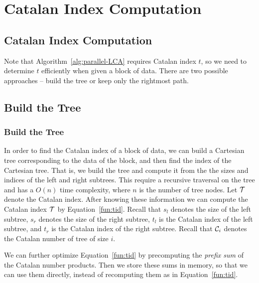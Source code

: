 \ifdefined\MasterThesis
\section{Catalan Index Computation}
\else
\subsection{Catalan Index Computation}
\fi

Note that Algorithm~\ref{alg:parallel-LCA} requires Catalan index $t$,
so we need to determine $t$ efficiently when given a block of data.
There are two possible approaches -- build the tree or keep only the
rightmost path.


\ifdefined\MasterThesis
\subsection{Build the Tree}
\else
\subsubsection{Build the Tree}
\fi

In order to find the Catalan index of a block of data, we can build a
Cartesian tree corresponding to the data of the block, and then find
the index of the Cartesian tree.  That is, we build the tree and
compute it from the the sizes and indices of the left and right
subtrees.  This require a recursive traversal on the tree and has a
$O(n)$ time complexity, where $n$ is the number of tree nodes.  Let
$\cal T$ denote the Catalan index.  After knowing these information we
can compute the Catalan index $\cal T$ by Equation~\ref{fun:tid}.
Recall that $s_l$ denotes the size of the left subtree, $s_r$ denotes
the size of the right subtree, $t_l$ is the Catalan index of the left
subtree, and $t_r$ is the Catalan index of the right subtree.  Recall
that ${\cal C}_i$ denotes the Catalan number of tree of size $i$.

% 



We can further optimize Equation~\ref{fun:tid} by precomputing the
{\em prefix sum} of the Catalan number products.  Then we store these
sums in memory, so that we can use them directly, instead of
recomputing them as in Equation~\ref{fun:tid}.  


